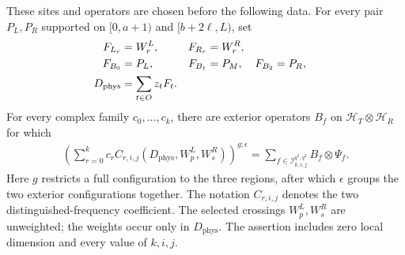 \begin{lemma}
    These sites and operators are chosen before the following data.
    For every pair $P_L,P_R$ supported on $[0,a+1)$ and
    $[b+2\ell,L)$,
    set
    \begin{align}
        F_{L_r}           & =W^L_r,               & F_{R_r} & =W^R_r,\notag                         \\
        F_{B_0}           & =P_L,                 & F_{B_1} & =P_M,         & F_{B_2} & =P_R,\notag \\
        D_{\mathrm{phys}} & =\sum_{t\in O}z_tF_t.
        \label{eq:selected_coefficient_physical_sum}
    \end{align}
    For every complex family $c_0,\ldots,c_k$, there are exterior operators
    $B_f$ on $\mathcal H_T\otimes\mathcal H_R$ for which
    \begin{align}
        \left(\sum_{r=0}^k c_r
        C_{r,i,j}(D_{\mathrm{phys}},W^L_p,W^R_s)\right)^{g;\epsilon}
        =\sum_{f\in\mathcal I_{k,i,j}^{q^2,q^2}}B_f\otimes\Psi_f.
        \label{eq:selected_coefficient_decomposition}
    \end{align}
    Here $g$ restricts a full configuration to the three regions, after which
    $\epsilon$ groups the two exterior configurations together. The notation
    $C_{r,i,j}$ denotes the two distinguished-frequency coefficient. The
    selected crossings $W^L_p,W^R_s$ are unweighted; the weights occur only
    in $D_{\mathrm{phys}}$.
    The assertion includes zero local dimension and every value of $k,i,j$.
\end{lemma}

